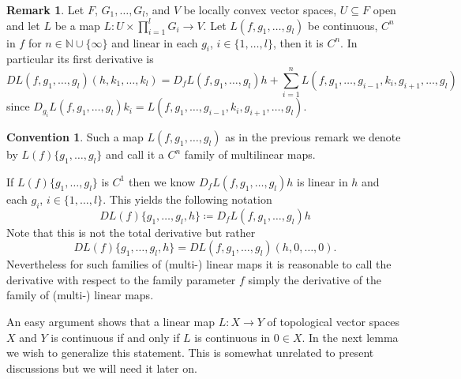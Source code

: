 \documentclass[12pt,a4paper]{article}
\theoremstyle{plain}
\theoremstyle{definition}
\newtheorem{remark}[theorem]{Remark}
\newtheorem{convention}[theorem]{Convention}
\newcommand{\N}{\mathbb{N}}
\begin{document}
\begin{remark}
Let $F$, $G_1,\ldots,G_l$, and $V$ be locally convex vector spaces, $U\subseteq F$ open and let $L$ be a map $L:U\times \prod_{i=1}^l G_i\to V$. Let $L(f,g_1,\ldots,g_l)$ be continuous, $C^n$ in $f$ for $n\in \N \cup \{\infty\}$ and linear in each $g_i$, $i\in \{1,\ldots,l\}$, then it is $C^n$. In particular its first derivative is
\begin{equation*}
    DL(f,g_1,\ldots,g_l)(h,k_1,\ldots,k_l)=D_fL(f,g_1,\ldots,g_l)h+\sum_{i=1}^nL(f,g_1,\ldots,g_{i-1},k_i,g_{i+1},\ldots,g_l)
\end{equation*}
since $D_{g_i}L(f,g_1,\ldots,g_l)k_i=L(f,g_1,\ldots,g_{i-1},k_i,g_{i+1},\ldots,g_l)$.
\end{remark}

\begin{convention}
\label{Conv:DiffOfFamOfLins}
Such a map $L(f,g_1,\ldots,g_l)$ as in the previous remark we denote by $L(f)\{g_1,\ldots,g_l\}$ and call it a $C^n$ family of multilinear maps.

If $L(f)\{g_1,\ldots,g_l\}$ is $C^1$ then we know $D_fL(f,g_1,\ldots,g_l)h$ is linear in $h$ and each $g_i$, $i\in \{1,\ldots,l\}$. This yields the following notation
\begin{equation*}
    DL(f)\{g_1,\ldots,g_l,h\}\coloneqq D_fL(f,g_1,\ldots,g_l)h
\end{equation*}
Note that this is not the total derivative but rather 
\begin{equation*}
    DL(f)\{g_1,\ldots,g_l,h\}= DL(f,g_1,\ldots,g_l)(h,0,\ldots,0).
\end{equation*}
Nevertheless for such families of (multi-) linear maps it is reasonable to call the derivative with respect to the family parameter $f$ simply the derivative of the family of (multi-) linear maps. 
\end{convention}


An easy argument shows that a linear map $L:X\to Y$ of topological vector spaces $X$ and $Y$ is continuous if and only if $L$ is continuous in $0\in X$. In the next lemma we wish to generalize this statement. This is somewhat unrelated to present discussions but we will need it later on.
\end{document}
